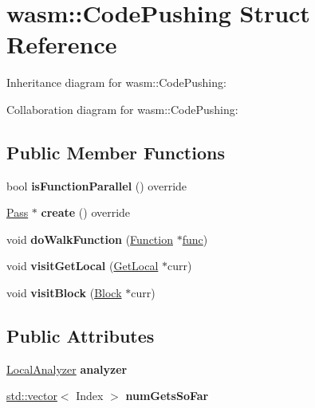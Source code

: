 \hypertarget{structwasm_1_1_code_pushing}{}\section{wasm\+:\+:Code\+Pushing Struct Reference}
\label{structwasm_1_1_code_pushing}


Inheritance diagram for wasm\+:\+:Code\+Pushing\+:


Collaboration diagram for wasm\+:\+:Code\+Pushing\+:
\subsection*{Public Member Functions}
\begin{DoxyCompactItemize}
\item 
\mbox{\label{structwasm_1_1_code_pushing_a92d5d6791f8b234e8573a6ea694a8ab4}} 
bool {\bfseries is\+Function\+Parallel} () override
\item 
\mbox{\label{structwasm_1_1_code_pushing_ad40dec81e41633e44f2c04adf02454f9}} 
\mbox{\hyperlink{classwasm_1_1_pass}{Pass}} $\ast$ {\bfseries create} () override
\item 
\mbox{\label{structwasm_1_1_code_pushing_ad05730b2afaa84fe89cfb145ac33203c}} 
void {\bfseries do\+Walk\+Function} (\mbox{\hyperlink{classwasm_1_1_function}{Function}} $\ast$\mbox{\hyperlink{structfunc}{func}})
\item 
\mbox{\label{structwasm_1_1_code_pushing_afb192b0d8315319283cfc44f9421827b}} 
void {\bfseries visit\+Get\+Local} (\mbox{\hyperlink{classwasm_1_1_get_local}{Get\+Local}} $\ast$curr)
\item 
\mbox{\label{structwasm_1_1_code_pushing_a760af5c9fb9f1ba891922a7263a64506}} 
void {\bfseries visit\+Block} (\mbox{\hyperlink{classwasm_1_1_block}{Block}} $\ast$curr)
\end{DoxyCompactItemize}
\subsection*{Public Attributes}
\begin{DoxyCompactItemize}
\item 
\mbox{\label{structwasm_1_1_code_pushing_abdaefe7739da9d9394a3fe96cf8feeef}} 
\mbox{\hyperlink{structwasm_1_1_local_analyzer}{Local\+Analyzer}} {\bfseries analyzer}
\item 
\mbox{\label{structwasm_1_1_code_pushing_adce5fe57daab2eb22d25496c2835e578}} 
\mbox{\hyperlink{classstd_1_1vector}{std\+::vector}}$<$ Index $>$ {\bfseries num\+Gets\+So\+Far}
\end{DoxyCompactItemize}
